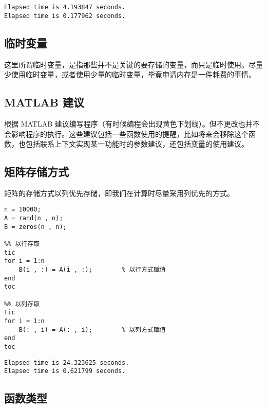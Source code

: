 \vspace{-0.8cm}
\begin{lstlisting}
Elapsed time is 4.193847 seconds.
Elapsed time is 0.177962 seconds.
\end{lstlisting}





\subsection{临时变量}

这里所谓临时变量，是指那些并不是关键的要存储的变量，而只是临时使用。尽量少使用临时变量，或者使用少量的临时变量，毕竟申请内存是一件耗费的事情。





\subsection{MATLAB 建议}

根据 MATLAB 建议编写程序（有时候编程会出现黄色下划线）。但不更改也并不会影响程序的执行。这些建议包括一些函数使用的提醒，比如将来会移除这个函数，也包括联系上下文实现某一功能时的参数建议，还包括变量的使用建议。





\subsection{矩阵存储方式}

矩阵的存储方式以列优先存储，即我们在计算时尽量采用列优先的方式。

\vspace{-0.8cm}
\begin{lstlisting}[caption = 矩阵不同存取方式效率对比]
n = 10000;
A = rand(n , n);
B = zeros(n , n);

%% 以行存取
tic
for i = 1:n
    B(i , :) = A(i , :);        % 以行方式赋值 
end
toc

%% 以列存取
tic
for i = 1:n
    B(: , i) = A(: , i);        % 以列方式赋值
end
toc
\end{lstlisting}

\vspace{-0.8cm}
\begin{lstlisting}
Elapsed time is 24.323625 seconds.
Elapsed time is 0.621799 seconds.
\end{lstlisting}

\subsection{函数类型}

